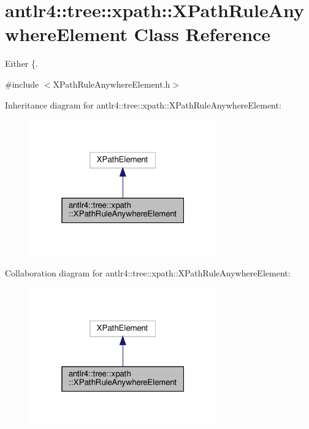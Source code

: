 \hypertarget{classantlr4_1_1tree_1_1xpath_1_1XPathRuleAnywhereElement}{}\section{antlr4\+:\+:tree\+:\+:xpath\+:\+:X\+Path\+Rule\+Anywhere\+Element Class Reference}
\label{classantlr4_1_1tree_1_1xpath_1_1XPathRuleAnywhereElement}


Either \{.  




{\ttfamily \#include $<$X\+Path\+Rule\+Anywhere\+Element.\+h$>$}



Inheritance diagram for antlr4\+:\+:tree\+:\+:xpath\+:\+:X\+Path\+Rule\+Anywhere\+Element\+:
\nopagebreak
\begin{figure}[H]
\begin{center}
\leavevmode
\includegraphics[width=229pt]{classantlr4_1_1tree_1_1xpath_1_1XPathRuleAnywhereElement__inherit__graph}
\end{center}
\end{figure}


Collaboration diagram for antlr4\+:\+:tree\+:\+:xpath\+:\+:X\+Path\+Rule\+Anywhere\+Element\+:
\nopagebreak
\begin{figure}[H]
\begin{center}
\leavevmode
\includegraphics[width=229pt]{classantlr4_1_1tree_1_1xpath_1_1XPathRuleAnywhereElement__coll__graph}
\end{center}
\end{figure}
